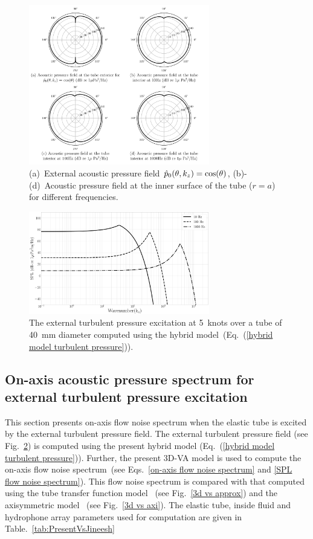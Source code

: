 \documentclass[twocolumn,10pt]{asme2ej}
\begin{document}
\begin{figure}[h]
    \centering
    \includegraphics[width=3.1in]{figure/polarplot_cos(theta).pdf}
    \caption{(a)~External acoustic pressure field $\Hat{p}_0(\theta,k_z) =\cos(\theta)$, (b)-(d)~Acoustic pressure field at the inner surface of the tube ($r=a$) for different frequencies.}
    \label{polar plot cos theta}
\end{figure}

\begin{figure}[h]
    \centering
    \includegraphics[width=3.1in]{figure/Comparison of turbulent pressure spectrum of Hybrid.pdf}
    \caption{The external turbulent pressure excitation at 5~knots over a tube of 40~mm diameter computed using the hybrid model~(Eq.~(\ref{hybrid model turbulent pressure})).}
    \label{Hybrid turbulent pressure spectrum}
\end{figure}


\subsection{On-axis acoustic pressure spectrum for external turbulent pressure excitation}
\label{Interior pressure}
This section presents on-axis flow noise spectrum when the elastic tube is excited by the external turbulent pressure field. The external turbulent pressure field (see Fig.~\ref{Hybrid turbulent pressure spectrum}) is computed using the present hybrid model (Eq.~(\ref{hybrid model turbulent pressure})). Further, the present 3D-VA model is used to compute the on-axis flow noise spectrum~(see Eqs.~\ref{on-axis flow noise spectrum} and \ref{SPL flow noise spectrum}). This flow noise spectrum is compared with that computed using the tube transfer function model~\cite{knight1996} (see Fig.~\ref{3d vs approx}) and the axisymmetric model~\cite{jineesh2013} (see Fig.~\ref{3d vs axi}). The elastic tube, inside fluid and hydrophone array parameters used for computation are given in Table.~\ref{tab:PresentVsJineesh}
\end{document}
